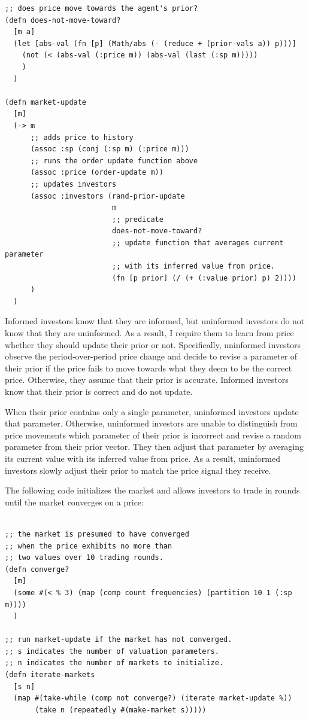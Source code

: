 \documentclass[11pt]{article}
\begin{document}
\begin{lstlisting}
;; does price move towards the agent's prior? 
(defn does-not-move-toward?
  [m a]
  (let [abs-val (fn [p] (Math/abs (- (reduce + (prior-vals a)) p)))]
    (not (< (abs-val (:price m)) (abs-val (last (:sp m)))))
    )
  )

(defn market-update
  [m]
  (-> m
      ;; adds price to history
      (assoc :sp (conj (:sp m) (:price m))) 
      ;; runs the order update function above
      (assoc :price (order-update m)) 
      ;; updates investors
      (assoc :investors (rand-prior-update
                         m
                         ;; predicate
                         does-not-move-toward? 
                         ;; update function that averages current parameter
                         ;; with its inferred value from price.
                         (fn [p prior] (/ (+ (:value prior) p) 2)))) 
      )
  )
\end{lstlisting}
\doublespacing

Informed investors know that they are informed, but uninformed investors do not know that they are uninformed. As a result, I require them to learn from price whether they should update their prior or not. Specifically, uninformed investors observe the period-over-period price change and decide to revise a parameter of their prior if the price fails to move towards what they deem to be the correct price. Otherwise, they assume that their prior is accurate. Informed investors know that their prior is correct and do not update.

When their prior contains only a single parameter, uninformed investors update that parameter. Otherwise, uninformed investors are unable to distinguish from price movements which parameter of their prior is incorrect and revise a random parameter from their prior vector. They then adjust that parameter by averaging its current value with its inferred value from price. As a result, uninformed investors slowly adjust their prior to match the price signal they receive.

The following code initializes the market and allows investors to trade in rounds until the market converges on a price:

\singlespacing
\lstset{language=Lisp,label= ,caption= ,captionpos=b,numbers=none}
\begin{lstlisting}

;; the market is presumed to have converged
;; when the price exhibits no more than
;; two values over 10 trading rounds.
(defn converge?
  [m]
  (some #(< % 3) (map (comp count frequencies) (partition 10 1 (:sp m))))
  )

;; run market-update if the market has not converged.
;; s indicates the number of valuation parameters.
;; n indicates the number of markets to initialize.
(defn iterate-markets
  [s n]
  (map #(take-while (comp not converge?) (iterate market-update %))
       (take n (repeatedly #(make-market s)))))

\end{lstlisting}
\doublespacing
\end{document}
